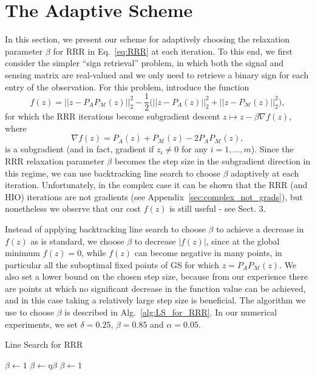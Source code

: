 \documentclass[journal]{IEEEtran}
\theoremstyle{definition}
\theoremstyle{remark}
\theoremstyle{definition}
\theoremstyle{problem}
\theoremstyle{definition}
\newcommand{\MM}{\mathcal{M}}
\begin{document}
\section{The Adaptive Scheme}
In this section, we present our scheme for adaptively choosing the relaxation parameter $\beta$ for RRR in Eq.~\ref{eq:RRR} at each iteration. To this end, we first consider the simpler ``sign retrieval'' problem, in which both the signal and sensing matrix are real-valued and we only need to retrieve a binary sign for each entry of the observation. For this problem, introduce the function 
\begin{equation}\label{eq:RRR_func}
    f(z) = ||z - P_AP_{\MM}(z)||_2^2 - \frac{1}{2}\Big(||z-P_A(z)||_2^2 + ||z-P_{\MM}(z)||_2^2\Big),
\end{equation}
for which the RRR iterations become subgradient descent $z\mapsto z-\beta\nabla f(z)$, where
\begin{equation}\label{eq:RRR_func_grad}
    \nabla f(z) = P_A(z) + P_{\MM}(z) - 2P_AP_{\MM}(z),
\end{equation}
is a subgradient (and in fact, gradient if $z_i\neq 0$ for any $i=1,\ldots, m$). Since the RRR relaxation parameter $\beta$ becomes the step size in the subgradient direction in this regime, we can use backtracking line search to choose $\beta$ adaptively at each iteration. Unfortunately, in the complex case it can be shown that the RRR (and HIO) iterations are not gradients (see Appendix~\ref{sec:complex_not_grads}), but nonetheless we observe that our cost $f(z)$ is still useful - see Sect. 3.

Instead of applying backtracking line search to choose $\beta$ to achieve a decrease in $f(z)$ as is standard, we choose $\beta$ to decrease $|f(z)|$, since at the global minimum $f(z)=0$, while $f(z)$ can become negative in many points, in particular all the suboptimal fixed points of GS for which $z = P_AP_{\MM}(z)$. We also set a lower bound on the chosen step size, because from our experience there are points at which no significant decrease in the function value can be achieved, and in this case taking a relatively large step size is beneficial. The algorithm we use to choose $\beta$ is described in Alg.~\ref{alg:LS_for_RRR}. In our numerical experiments, we set $\delta = 0.25$, $\beta = 0.85$ and $\alpha=0.05$.

\begin{algorithm}
\caption{Line Search for RRR}\label{alg:LS_for_RRR}
\begin{algorithmic}
\INPUT{$\alpha,\eta,\delta$}
\OUTPUT{$\beta$}
\State $\beta\gets 1$ 
    \State $\beta\gets \eta\beta$
\EndWhile
\If{$\beta \leq \delta$} 
    \State $\beta \gets 1$
\EndIf
\end{algorithmic}
\end{algorithm}
\end{document}
